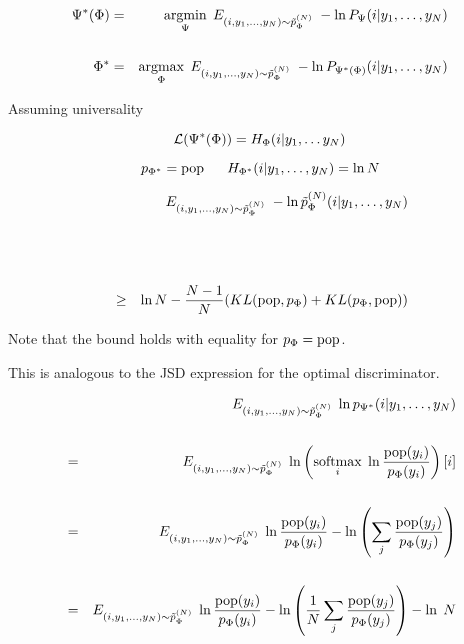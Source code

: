 {\begin{eqnarray*}
\Psi^*(\Phi) & = & \operatorname*{argmin}_\Psi\; E_{(i,y_1,\ldots,y_{N})\sim \tilde{p}_\Phi^{(N)}} \;- \ln P_\Psi(i|y_1,\ldots,y_{N}) \\
\\
\Phi^* & = & \operatorname*{argmax}_\Phi\; E_{(i,y_1,\ldots,y_{N})\sim \tilde{p}_\Phi^{(N)}} \;- \ln P_{\Psi^*(\Phi)}(i|y_1,\ldots,y_{N})
\end{eqnarray*}

\vfill
Assuming universality

\vfill
$${\cal L}(\Psi^*(\Phi)) = H_\Phi(i|y_1,\ldots y_{N})$$

\vfill
$$p_{\Phi^*} = \mathrm{pop}\;\;\;\;\;\;H_{\Phi^*}(i|y_1,\ldots,y_N) = \ln N$$



\begin{eqnarray*}
  && E_{(i,y_1,\dots,y_{N}) \sim \tilde{p}_\Phi^{(N)}}\;- \ln \tilde{p}^{(N)}_\Phi(i|y_1,\ldots,y_{N}) \\
  \\
  \\
  \\
  & \geq & \ln N - \frac{N-1}{N}(KL(\mathrm{pop},p_\Phi) + KL(p_\Phi,\mathrm{pop}))
\end{eqnarray*}

\vfill
Note that the bound holds with equality for $p_\Phi = \mathrm{pop}$.

\vfill
This is analogous to the JSD expression for the optimal discriminator.

{\huge
 \begin{eqnarray*}
    & & E_{(i,y_1,\ldots,y_{N}) \sim \tilde{p}_\Phi^{(N)}}\;\ln p_{\Psi^*}(i|y_1,\ldots,y_{N}) \\
    \\
    & = & E_{(i,y_1,\ldots,y_{N}) \sim \tilde{p}_\Phi^{(N)}}\;\ln \left(\operatorname*{softmax}_i \;\ln \frac{\mathrm{pop}(y_i)}{p_\Phi(y_i)}\right)[i] \\
    \\
    & = & E_{(i,y_1,\ldots,y_{N}) \sim \tilde{p}_\Phi^{(N)}}\;\ln\frac{\mathrm{pop}(y_i)}{p_\Phi(y_i)} - \ln\left(\sum_j \frac{\mathrm{pop}(y_j)}{p_\Phi(y_j)} \right) \\
    \\
    & = & E_{(i,y_1,\ldots,y_{N}) \sim \tilde{p}_\Phi^{(N)}}\;\ln\frac{\mathrm{pop}(y_i)}{p_\Phi(y_i)} - \ln\left(\frac{1}{N}\sum_j \frac{\mathrm{pop}(y_j)}{p_\Phi(y_j)} \right) - \ln\;N
  \end{eqnarray*}
}

}
